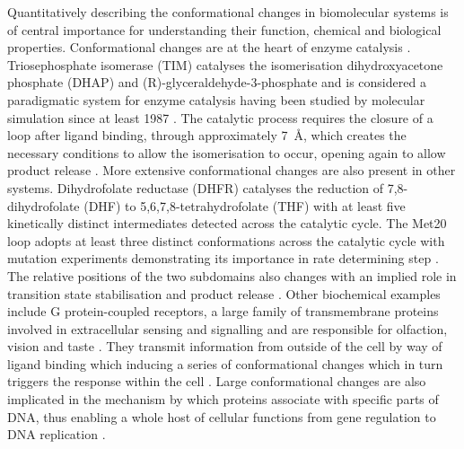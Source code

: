 Quantitatively  describing the conformational changes in biomolecular systems is of central importance for understanding their function, chemical and biological properties. Conformational changes are at the heart of enzyme catalysis \cite{hammesMultipleConformationalChanges2002b,hammes-schifferRelatingProteinMotion2006, klinmanHydrogenTunnelingLinks2013}. Triosephosphate isomerase (TIM) catalyses the isomerisation dihydroxyacetone phosphate (DHAP) and (R)-glyceraldehyde-3-phosphate \cite{LoopMotionTriosephosphate} and is considered a paradigmatic system for enzyme catalysis \cite{richardParadigmEnzymeCatalyzedProton2012a} having been studied by molecular simulation since at least 1987 \cite{brownMolecularDynamicsSimulations1987, josephAnatomyConformationalChange1990}.  The catalytic process requires the closure of a loop after ligand binding, through approximately \SI{7}{\angstrom}, which creates the necessary conditions to allow the isomerisation to occur,  opening again to allow product release \cite{LoopMotionTriosephosphate}. More extensive conformational changes are also present in other systems.  Dihydrofolate reductase (DHFR) catalyses the reduction of 7,8-dihydrofolate (DHF) to 5,6,7,8-tetrahydrofolate (THF) \cite{schnellStructureDynamicsCatalytic2004a} with at least five kinetically distinct intermediates detected \cite{fierkeConstructionEvaluationKinetic1987} across the catalytic cycle. The Met20 loop adopts at least three distinct conformations across the catalytic cycle \cite{sawayaLoopSubdomainMovements1997} with mutation experiments demonstrating its importance in rate determining step \cite{liFunctionalRoleMobile1992}. The relative positions of the two subdomains also changes with an implied role in transition state stabilisation and product release \cite{sawayaLoopSubdomainMovements1997}. Other biochemical examples include G protein-coupled receptors, a large family of transmembrane proteins involved in extracellular sensing and signalling and are responsible for olfaction, vision and taste \cite{rosenbaumStructureFunctionGproteincoupled2009}.  They transmit information from outside of the cell by way of ligand binding which inducing a series of conformational changes which in turn triggers the response within the cell \cite{bockenhauerConformationalDynamicsSingle2011a}. Large conformational changes are also implicated in the mechanism by which proteins associate with specific parts of DNA, thus enabling a whole host of cellular functions from gene regulation to DNA replication \cite{vandervaartCoupledBindingBending2015}.  

